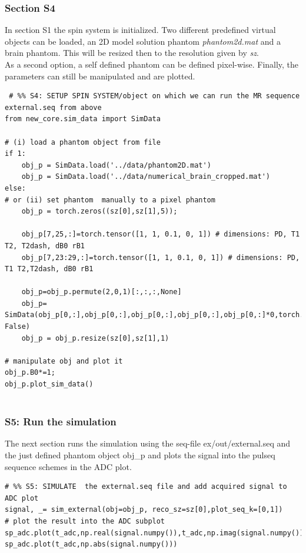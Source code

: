 \documentclass[a4paper,12pt]{extarticle}
\begin{document}
\subsubsection{Section S4}
In section S1 the spin system is initialized. Two different predefined virtual objects can be loaded, an 2D model solution phantom \emph{phantom2d.mat} and a brain phantom. This will be resized then to the resolution given by \emph{sz}.  \\
As a second option, a self defined phantom can be defined pixel-wise.
Finally, the parameters can still be manipulated and are plotted.

\begin{verbatim}
 # %% S4: SETUP SPIN SYSTEM/object on which we can run the MR sequence external.seq from above
from new_core.sim_data import SimData

# (i) load a phantom object from file
if 1:
    obj_p = SimData.load('../data/phantom2D.mat')
    obj_p = SimData.load('../data/numerical_brain_cropped.mat')
else:
# or (ii) set phantom  manually to a pixel phantom
    obj_p = torch.zeros((sz[0],sz[1],5)); 
    
    obj_p[7,25,:]=torch.tensor([1, 1, 0.1, 0, 1]) # dimensions: PD, T1 T2, T2dash, dB0 rB1
    obj_p[7,23:29,:]=torch.tensor([1, 1, 0.1, 0, 1]) # dimensions: PD, T1 T2,T2dash, dB0 rB1
    
    obj_p=obj_p.permute(2,0,1)[:,:,:,None]
    obj_p= SimData(obj_p[0,:],obj_p[0,:],obj_p[0,:],obj_p[0,:],obj_p[0,:]*0,torch.ones(1,obj_p.shape[1],obj_p.shape[2],1),torch.ones(1,obj_p.shape[1],obj_p.shape[2],1),normalize_B0_B1= False)
    obj_p = obj_p.resize(sz[0],sz[1],1)
    
# manipulate obj and plot it
obj_p.B0*=1;
obj_p.plot_sim_data()


\end{verbatim}

\subsubsection{S5: Run the simulation}
The next section runs the simulation using the seq-file ex/out/external.seq and  the just defined phantom object obj\_p and plots the signal into the pulseq sequence schemes in the ADC plot.

\begin{verbatim}
# %% S5: SIMULATE  the external.seq file and add acquired signal to ADC plot
signal, _= sim_external(obj=obj_p, reco_sz=sz[0],plot_seq_k=[0,1])
# plot the result into the ADC subplot
sp_adc.plot(t_adc,np.real(signal.numpy()),t_adc,np.imag(signal.numpy()))
sp_adc.plot(t_adc,np.abs(signal.numpy()))

\end{verbatim}
\end{document}
